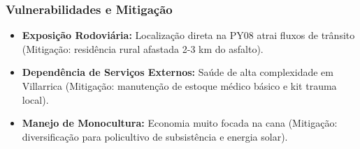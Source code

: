 \subsubsection{Vulnerabilidades e
Mitigação}

\begin{itemize}
\tightlist
\item
  \textbf{Exposição Rodoviária:} Localização direta na PY08 atrai fluxos
  de trânsito (Mitigação: residência rural afastada 2-3 km do asfalto).
\item
  \textbf{Dependência de Serviços Externos:} Saúde de alta complexidade
  em Villarrica (Mitigação: manutenção de estoque médico básico e kit
  trauma local).
\item
  \textbf{Manejo de Monocultura:} Economia muito focada na cana
  (Mitigação: diversificação para policultivo de subsistência e energia
  solar).
\end{itemize}

